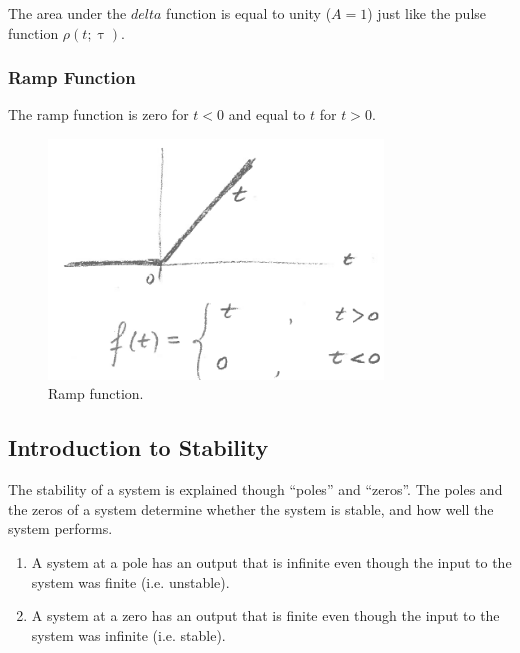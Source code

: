 \documentclass[12pt,letter]{article}
\begin{document}
The area under the $delta$ function is equal to unity ($A=1$) just like the pulse function $\rho(t;\uptau)$.

\subsubsection{Ramp Function}

The ramp function is zero for $t<0$ and equal to $t$ for $t>0$. 

\begin{figure}[H]
	\centering
	\includegraphics[width=3.5in]{../figures/ramp_function.png}
	\caption{Ramp function.}
\end{figure}



	\subsection{Introduction to Stability}

	The stability of a system is explained though ``poles'' and ``zeros''. The poles and the zeros of a system determine whether the system is stable, and how well the system performs.

	\begin{enumerate}
		\item A system at a pole has an output that is infinite even though the input to the system was finite (i.e. unstable). 
		\item A system at a zero has an output that is finite even though the input to the system was infinite (i.e. stable).
	\end{enumerate}
 
\end{document}
